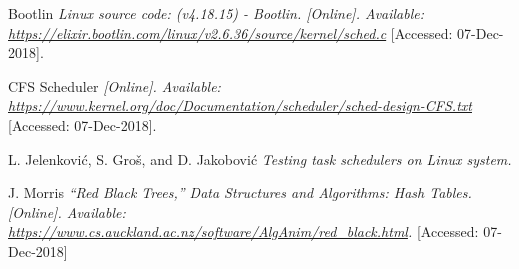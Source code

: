 \documentclass[conference,12pt, ]{IEEEtran}
\begin{document}
  \begin{thebibliography}{999}

   Bootlin {\em Linux source code: (v4.18.15) - Bootlin. [Online]. Available: \url{https://elixir.bootlin.com/linux/v2.6.36/source/kernel/sched.c}} [Accessed: 07-Dec-2018].

    CFS Scheduler {\em [Online]. Available: \url{https://www.kernel.org/doc/Documentation/scheduler/sched-design-CFS.txt}} [Accessed: 07-Dec-2018].

   L. Jelenković, S. Groš, and D. Jakobović {\em Testing task schedulers on Linux system.} 

   J. Morris {\em “Red Black Trees,” Data Structures and Algorithms: Hash Tables. [Online]. Available: \url{https://www.cs.auckland.ac.nz/software/AlgAnim/red_black.html}.} [Accessed: 07-Dec-2018]

  \end{thebibliography}
\end{document}
